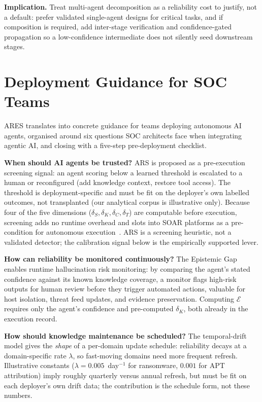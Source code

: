 \documentclass[journal,compsoc]{IEEEtran}
\newcommand{\ARES}{\textsc{ARES}}
\begin{document}
\textbf{Implication.} Treat multi-agent decomposition as a reliability
cost to justify, not a default: prefer validated single-agent designs
for critical tasks, and if composition is required, add inter-stage
verification and confidence-gated propagation so a low-confidence
intermediate does not silently seed downstream stages.

\section{Deployment Guidance for SOC Teams}

\ARES{} translates into concrete guidance for teams deploying
autonomous AI agents, organised around six questions SOC architects
face when integrating agentic AI, and closing with a five-step
pre-deployment checklist.

\textbf{When should AI agents be trusted?}
ARS is proposed as a pre-execution screening signal: an agent scoring
below a learned threshold is escalated to a human or reconfigured
(add knowledge context, restore tool access). The threshold is
deployment-specific and must be fit on the deployer's own labelled
outcomes, not transplanted (our analytical corpus is illustrative
only). Because four of the five dimensions ($\delta_S, \delta_K,
\delta_C, \delta_T$) are computable before execution, screening adds no
runtime overhead and slots into SOAR platforms as a pre-condition for
autonomous execution~\cite{nist_ai_rmf}. ARS is a screening heuristic,
not a validated detector; the calibration signal below is the
empirically supported lever.

\textbf{How can reliability be monitored continuously?}
The Epistemic Gap enables runtime hallucination risk monitoring: by
comparing the agent's stated confidence against its known knowledge
coverage, a monitor flags high-risk outputs for human review before
they trigger automated actions, valuable for host isolation, threat
feed updates, and evidence preservation. Computing $\mathcal{E}$
requires only the agent's confidence and pre-computed $\delta_K$,
both already in the execution record.

\textbf{How should knowledge maintenance be scheduled?}
The temporal-drift model gives the \textit{shape} of a per-domain
update schedule: reliability decays at a domain-specific rate
$\lambda$, so fast-moving domains need more frequent refresh.
Illustrative constants ($\lambda = 0.005$~day$^{-1}$ for ransomware,
$0.001$ for APT attribution) imply roughly quarterly versus annual
refresh, but must be fit on each deployer's own drift data; the
contribution is the schedule form, not these numbers.
\end{document}
